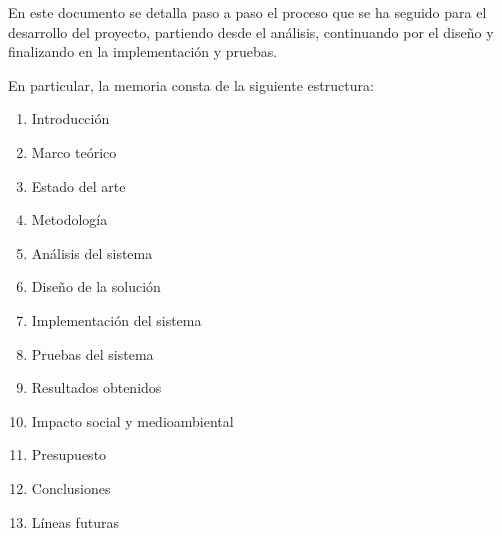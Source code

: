 En este documento se detalla paso a paso el proceso que se ha seguido para el desarrollo del proyecto, partiendo desde el análisis, continuando por el diseño y finalizando en la implementación y pruebas. 


En particular, la memoria consta de la siguiente estructura:
\begin{enumerate}
    \item Introducción
    \item Marco teórico
    \item Estado del arte
    \item Metodología 
    \item Análisis del sistema
    \item Diseño de la solución
    \item Implementación del sistema
    \item Pruebas del sistema
    \item Resultados obtenidos
    \item Impacto social y medioambiental
    \item Presupuesto
    \item Conclusiones
    \item Líneas futuras
\end{enumerate}